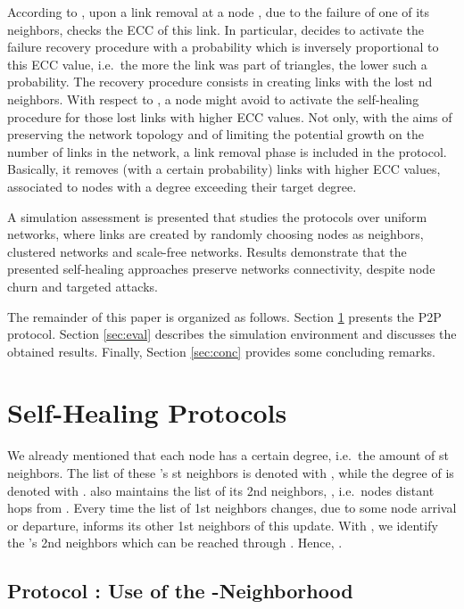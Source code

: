 \documentclass[10pt, conference, compsocconf]{IEEEtran}
\begin{document}
According to , upon a link removal at a node , due to the failure of one of its neighbors,  checks the ECC of this link. In particular,  decides to activate the failure recovery procedure with a probability which is inversely proportional to this ECC value, i.e.~the more the link was part of triangles, the lower such a probability. 
The recovery procedure consists in creating links with the lost nd neighbors.
With respect to , a node might avoid to activate the self-healing procedure for those lost links with higher ECC values.
Not only, with the aims of preserving the network topology and of limiting the potential growth on the number of links in the network, a link removal phase is included in the protocol. Basically, it removes (with a certain probability) links with higher ECC values, associated to nodes with a degree exceeding their target degree.

A simulation assessment is presented that studies the protocols over uniform networks, where links are created by randomly choosing nodes as neighbors, clustered networks and scale-free networks. 
Results demonstrate that the presented self-healing approaches preserve networks connectivity, despite node churn and targeted attacks.


The remainder of this paper is organized as follows. Section \ref{sec:prot} presents the P2P protocol. Section \ref{sec:eval} describes the simulation environment and discusses the obtained results. Finally, Section \ref{sec:conc} provides some concluding remarks.

\section{Self-Healing Protocols}\label{sec:prot}

We already mentioned that each node  has a certain degree, i.e.~the amount of st neighbors. 
The list of these 's st neighbors is denoted with , while the degree of  is denoted with .  also maintains the list of its 2nd neigh\-bors, , i.e.~nodes distant  hops from . 
Every time the list of 1st neighbors 
changes, due to some node arrival or departure,  informs its other 1st neighbors of this update.
With , we identify the 's 2nd neighbors which can be reached through . Hence, .

\subsection{Protocol : Use of the -Neighborhood}
\end{document}
